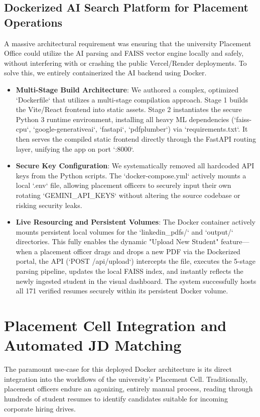 \documentclass[12pt,a4paper]{report}
\begin{document}
\subsection{Dockerized AI Search Platform for Placement Operations}
A massive architectural requirement was ensuring that the university Placement Office could utilize the AI parsing and FAISS vector engine locally and safely, without interfering with or crashing the public Vercel/Render deployments. To solve this, we entirely containerized the AI backend using Docker. 
\begin{itemize}
    \item \textbf{Multi-Stage Build Architecture}: We authored a complex, optimized `Dockerfile` that utilizes a multi-stage compilation approach. Stage 1 builds the Vite/React frontend into static assets. Stage 2 instantiates the secure Python 3 runtime environment, installing all heavy ML dependencies (`faiss-cpu`, `google-generativeai`, `fastapi`, `pdfplumber`) via `requirements.txt`. It then serves the compiled static frontend directly through the FastAPI routing layer, unifying the app on port `:8000`.
    \item \textbf{Secure Key Configuration}: We systematically removed all hardcoded API keys from the Python scripts. The `docker-compose.yml` actively mounts a local `.env` file, allowing placement officers to securely input their own rotating `GEMINI\_API\_KEYS` without altering the source codebase or risking security leaks.
    \item \textbf{Live Resourcing and Persistent Volumes}: The Docker container actively mounts persistent local volumes for the `linkedin\_pdfs/` and `output/` directories. This fully enables the dynamic "Upload New Student" feature—when a placement officer drags and drops a new PDF via the Dockerized portal, the API (`POST /api/upload`) intercepts the file, executes the 5-stage parsing pipeline, updates the local FAISS index, and instantly reflects the newly ingested student in the visual dashboard. The system successfully hosts all 171 verified resumes securely within its persistent Docker volume.
\end{itemize}

\section{Placement Cell Integration and Automated JD Matching}

The paramount use-case for this deployed Docker architecture is its direct integration into the workflows of the university's Placement Cell. Traditionally, placement officers endure an agonizing, entirely manual process, reading through hundreds of student resumes to identify candidates suitable for incoming corporate hiring drives.
\end{document}
